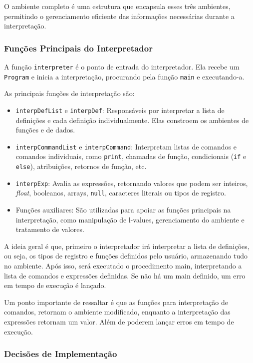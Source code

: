 \documentclass{article}
\begin{document}
O ambiente completo é uma estrutura que encapsula esses três ambientes, permitindo o gerenciamento eficiente das informações necessárias durante a interpretação.

\subsubsection{Funções Principais do Interpretador}

A função \texttt{interpreter} é o ponto de entrada do interpretador. Ela recebe um \texttt{Program} e inicia a interpretação, procurando pela função \texttt{main} e executando-a.

As principais funções de interpretação são:

\begin{itemize}
    \item \texttt{interpDefList} e \texttt{interpDef}: Responsáveis por interpretar a lista de definições e cada definição individualmente. Elas constroem os ambientes de funções e de dados.
    \item \texttt{interpCommandList} e \texttt{interpCommand}: Interpretam listas de comandos e comandos individuais, como \texttt{print}, chamadas de função, condicionais (\texttt{if} e \texttt{else}), atribuições, retornos de função, etc.
    \item \texttt{interpExp}: Avalia as expressões, retornando valores que podem ser inteiros, \textit{float}, booleanos, arrays, \texttt{null}, caracteres literais ou tipos de registro.
    \item Funções auxiliares: São utilizadas para apoiar as funções principais na interpretação, como manipulação de l-values, gerenciamento do ambiente e tratamento de valores.
\end{itemize}

A ideia geral é que, primeiro o interpretador irá interpretar a lista de definições, ou seja, os tipos de registro e funções definidos pelo usuário, armazenando tudo no ambiente. Após isso, será executado o procedimento main, interpretando a lista de comandos e expressões definidas. Se não há um main definido, um erro em tempo de execução é lançado.

Um ponto importante de ressaltar é que as funções para interpretação de comandos, retornam o ambiente modificado, enquanto a interpretação das expressões retornam um valor. Além de poderem lançar erros em tempo de execução.

\subsubsection{Decisões de Implementação}
\end{document}
